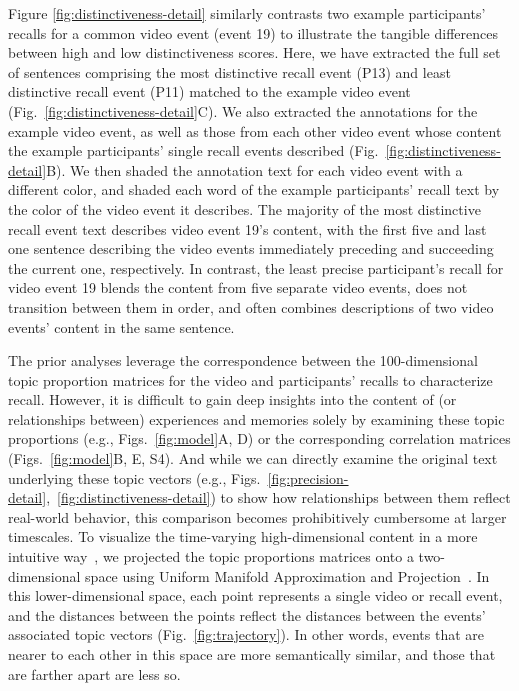 \documentclass{article}
\newcommand{\corrmats}{S4}
\begin{document}
Figure \ref{fig:distinctiveness-detail} similarly contrasts two example participants' recalls for a common video event (event 19) to illustrate the tangible differences between high and low distinctiveness scores.  Here, we have extracted the full set of sentences comprising the most distinctive recall event (P13) and least distinctive recall event (P11) matched to the example video event (Fig.~\ref{fig:distinctiveness-detail}C).  We also extracted the annotations for the example video event, as well as those from each other video event whose content the example participants' single recall events described (Fig.~\ref{fig:distinctiveness-detail}B).  We then shaded the annotation text for each video event with a different color, and shaded each word of the example participants' recall text by the color of the video event it describes.  The majority of the most distinctive recall event text describes video event 19's content, with the first five and last one sentence describing the video events immediately preceding and succeeding the current one, respectively.  In contrast, the least precise participant's recall for video event 19 blends the content from five separate video events, does not transition between them in order, and often combines descriptions of two video events' content in the same sentence.

The prior analyses leverage the correspondence between the 100-dimensional topic proportion matrices for the video and participants' recalls to characterize recall.  However, it is difficult to gain deep insights into the content of (or relationships between) experiences and memories solely by examining these topic proportions (e.g., Figs.~\ref{fig:model}A, D) or the corresponding correlation matrices (Figs.~\ref{fig:model}B, E, \corrmats).  And while we can directly examine the original text underlying these topic vectors (e.g., Figs.~\ref{fig:precision-detail},~\ref{fig:distinctiveness-detail}) to show how relationships between them reflect real-world behavior, this comparison becomes prohibitively cumbersome at larger timescales.  To visualize the time-varying high-dimensional content in a more intuitive way~\citep{HeusEtal18a}, we projected the topic proportions matrices onto a two-dimensional space using Uniform Manifold Approximation and Projection~\citep[UMAP; ][]{McInEtal18}.  In this lower-dimensional space, each point represents a single video or recall event, and the distances between the points reflect the distances between the events' associated topic vectors (Fig.~\ref{fig:trajectory}). In other words, events that are nearer to each other in this space are more semantically similar, and those that are farther apart are less so.
\end{document}
